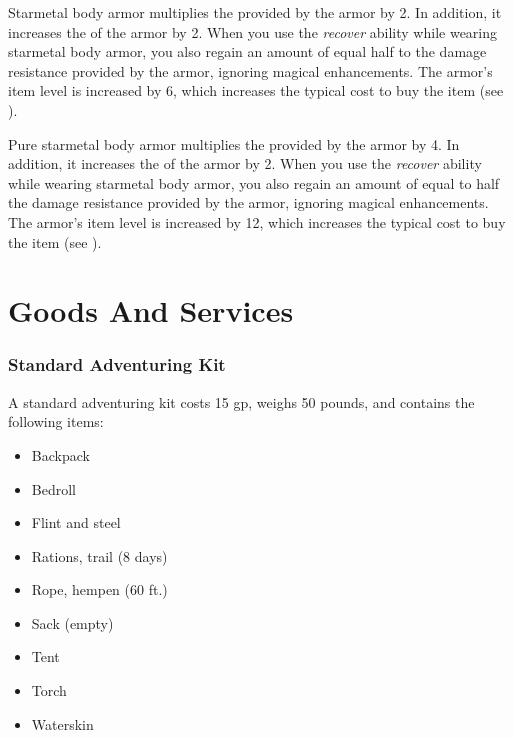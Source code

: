          Starmetal body armor multiplies the  provided by the armor by 2.
        In addition, it increases the  of the armor by 2.
        When you use the \textit{recover} ability while wearing starmetal body armor, you also regain an amount of  equal half to the damage resistance provided by the armor, ignoring magical enhancements.
        The armor's item level is increased by 6, which increases the typical cost to buy the item (see ).

         Pure starmetal body armor multiplies the  provided by the armor by 4.
        In addition, it increases the  of the armor by 2.
        When you use the \textit{recover} ability while wearing starmetal body armor, you also regain an amount of  equal to half the damage resistance provided by the armor, ignoring magical enhancements.
        The armor's item level is increased by 12, which increases the typical cost to buy the item (see ).

\section{Goods And Services}

    \subsubsection{Standard Adventuring Kit}
        A standard adventuring kit costs 15 gp, weighs 50 pounds, and contains the following items:
        \begin{itemize}
            \item Backpack
            \item Bedroll
            \item Flint and steel
            \item Rations, trail (8 days)
            \item Rope, hempen (60 ft.)
            \item Sack (empty)
            \item Tent
            \item Torch
            \item Waterskin
        \end{itemize}

